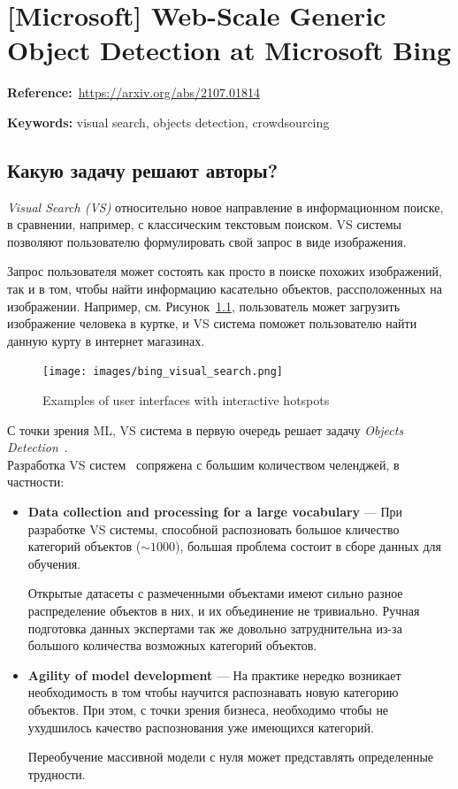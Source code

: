 \chapter{[Microsoft] Web-Scale Generic Object Detection at Microsoft Bing}

\textbf{Reference:}~\url{https://arxiv.org/abs/2107.01814}

\textbf{Keywords:} visual search, objects detection, crowdsourcing

\section*{Какую задачу решают авторы?}

\textit{Visual Search (VS)} относительно новое направление в информационном поиске, в сравнении, например, с классическим текстовым поиском.
VS системы позволяют пользователю формулировать свой запрос в виде изображения.

Запрос пользователя может состоять как просто в поиске похожих изображений, так и в том, чтобы найти информацию касательно объектов, рассположенных на изображении.
Например, см. Рисунок~\ref{fig:bing_visual_search}, пользователь может загрузить изображение человека в куртке, и VS система поможет пользователю найти данную курту в интернет магазинах.

\begin{figure}[ht]
  \centering
  \texttt{[image: images/bing\_visual\_search.png]}
  \caption{\footnotesize{Examples of user interfaces with interactive hotspots}}
  \label{fig:bing_visual_search}
\end{figure}

С точки зрения ML, VS система в первую очередь решает задачу \textit{Objects Detection}~\cite{lin2017focal}. \\

Разработка VS систем~\cite{hu2018web,zhang2018visual} сопряжена с большим количеством челенджей, в частности:
\begin{itemize}
    \item \textbf{Data collection and processing for a large vocabulary} --- При разработке VS системы, способной распозновать большое кличество категорий объектов ($\sim 1000$), большая проблема состоит в сборе данных для обучения.
    
        Открытые датасеты с размеченными объектами имеют сильно разное распределение объектов в них, и их объединение не тривиально. 
        Ручная подготовка данных экспертами так же довольно затруднительна из-за большого количества возможных категорий объектов.
    \item \textbf{Agility of model development} --- На практике нередко возникает необходимость в том чтобы научится распознавать новую категорию объектов. 
        При этом, с точки зрения бизнеса, необходимо чтобы не ухудшилось качество распознования уже имеющихся категорий.
    
        Переобучение массивной модели с нуля может представлять определенные трудности.
\end{itemize}

